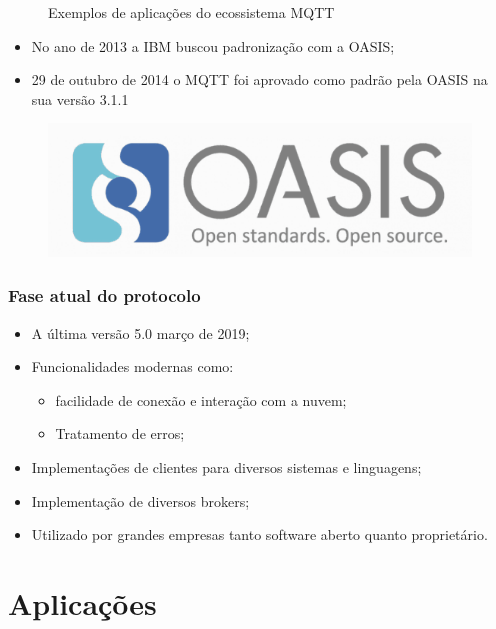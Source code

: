 \documentclass[12pt]{beamer}
\begin{document}
\begin{frame}[allowframebreaks]
\begin{figure}[!htb]
\begin{columns}[c]
\begin{column}{.5\textwidth}
            \end{column}
        \end{columns}
        \caption{\label{fig:logos_ferramentas_mqtt}Exemplos de aplicações do ecossistema MQTT}
    \end{figure}
    \framebreak
    \begin{itemize}
        \item No ano de 2013 a IBM buscou padronização com a OASIS;
        \item 29 de outubro de 2014 o MQTT foi aprovado como padrão pela OASIS na sua versão 3.1.1
    \end{itemize}
    \begin{figure}[!htb]
        \centering
        \includegraphics[width=.8\textwidth]{Oasis_logo}
    \end{figure}
\end{frame}

\begin{frame}
    \frametitle{Fase atual do protocolo}
    \begin{itemize}
        \item A última versão 5.0 março de 2019;
        \item Funcionalidades modernas como:
            \begin{itemize}
                \item facilidade de conexão e interação com a nuvem;
                \item Tratamento de erros;
            \end{itemize}
        \item Implementações de clientes para diversos sistemas e linguagens;
        \item Implementação de diversos brokers;
        \item Utilizado por grandes empresas tanto software aberto quanto proprietário.
    \end{itemize}
\end{frame}

\section{Aplicações}\label{Aplicacoes}
\end{document}
